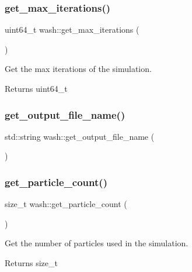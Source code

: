 \subsubsection{\texorpdfstring{get\+\_\+max\+\_\+iterations()}{get\_max\_iterations()}}
{\footnotesize\ttfamily uint64\+\_\+t wash\+::get\+\_\+max\+\_\+iterations (\begin{DoxyParamCaption}{ }\end{DoxyParamCaption})}



Get the max iterations of the simulation. 

\begin{DoxyReturn}{Returns}
uint64\+\_\+t 
\end{DoxyReturn}
\mbox{\label{namespacewash_a5ffed72aa633299d2cb1692076563f55}} 
\subsubsection{\texorpdfstring{get\+\_\+output\+\_\+file\+\_\+name()}{get\_output\_file\_name()}}
{\footnotesize\ttfamily std\+::string wash\+::get\+\_\+output\+\_\+file\+\_\+name (\begin{DoxyParamCaption}{ }\end{DoxyParamCaption})}

\mbox{\label{namespacewash_a3b281fefe2419e7bc1450029b0324ab8}} 
\subsubsection{\texorpdfstring{get\+\_\+particle\+\_\+count()}{get\_particle\_count()}}
{\footnotesize\ttfamily size\+\_\+t wash\+::get\+\_\+particle\+\_\+count (\begin{DoxyParamCaption}{ }\end{DoxyParamCaption})}



Get the number of particles used in the simulation. 

\begin{DoxyReturn}{Returns}
size\+\_\+t 
\end{DoxyReturn}
\mbox{\label{namespacewash_aa3671e8d906a2f71aa6a17ce42029ad5}} 
